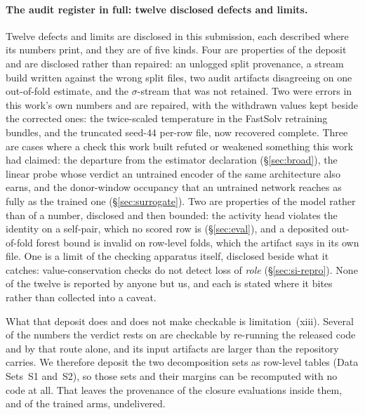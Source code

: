 \paragraph{The audit register in full: twelve disclosed defects and limits.}
Twelve defects and limits are disclosed in this submission, each
described where its numbers print, and they are of five kinds. Four are properties of the deposit and are
disclosed rather than repaired: an unlogged split provenance, a stream build written against the
wrong split files, two audit artifacts disagreeing on one out-of-fold estimate, and the
$\sigma$-stream that was not retained. Two were errors in this work's own numbers and are repaired,
with the withdrawn values kept beside the corrected ones: the twice-scaled temperature in the
FastSolv retraining bundles, and the truncated seed-$44$ per-row file, now recovered complete.
Three are cases where a check this work built refuted or weakened something this work had claimed:
the departure from the estimator declaration (\S\ref{sec:broad}), the linear probe whose verdict an
untrained encoder of the same architecture also earns, and the donor-window occupancy that an
untrained network reaches as fully as the trained one (\S\ref{sec:surrogate}). Two are properties
of the model rather than of a number, disclosed and then bounded: the activity head violates the
identity on a self-pair, which no scored row is (\S\ref{sec:eval}), and a deposited out-of-fold
forest bound is invalid on row-level folds, which the artifact says in its own file. One is a limit
of the checking apparatus itself, disclosed beside what it catches: value-conservation checks do not
detect loss of \emph{role} (\S\ref{sec:si-repro}). None of the twelve is reported by anyone but
us, and each is stated where it bites rather than collected into a caveat.

What that deposit does and does not make checkable is limitation~(xiii). Several of the numbers
the verdict rests on are checkable by re-running the released code and by that route alone, and its
input artifacts are larger than the repository carries. We therefore deposit the two decomposition
sets as row-level
tables (Data Sets~S1 and~S2), so those sets and their margins can be recomputed with no code at all.
That leaves the provenance of the closure evaluations inside them, and of the trained arms, undelivered.


